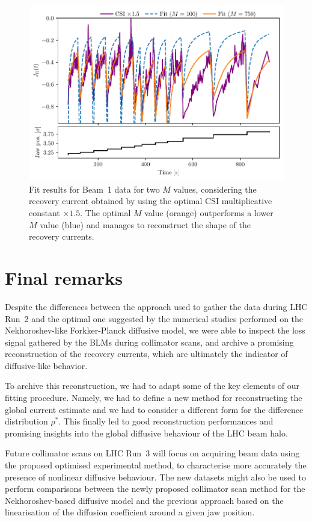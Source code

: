 \begin{figure}[hpt]
    \centering
    \includegraphics[trim={0 2.5mm 0 3mm}, clip, width=0.95\columnwidth]{5_Diffusion_measurement_LHC/figs/fifth.pdf}
    \caption{Fit results for Beam~1 data for two $M$ values, considering the recovery current obtained by using the optimal CSI multiplicative constant $\times 1.5$. The optimal $M$ value (orange) outperforms a lower $M$ value (blue) and manages to reconstruct the shape of the recovery currents.}
    \label{fig:fifth}
\end{figure}
%
\section{Final remarks}
%
Despite the differences between the approach used to gather the data during LHC Run~2 and the optimal one suggested by the numerical studies performed on the Nekhoroshev-like Forkker-Planck diffusive model, we were able to inspect the loss signal gathered by the BLMs during collimator scans, and archive a promising reconstruction of the recovery currents, which are ultimately the indicator of diffusive-like behavior.

To archive this reconstruction, we had to adapt some of the key elements of our fitting procedure. Namely, we had to define a new method for reconstructing the global current estimate and we had to consider a different form for the difference distribution $\rho^\ast$. This finally led to good reconstruction performances and promising insights into the global diffusive behaviour of the LHC beam halo.

Future collimator scans on LHC Run~3 will focus on acquiring beam data using the proposed optimised experimental method, to characterise more accurately the presence of nonlinear diffusive behaviour. The new datasets might also be used to perform comparisons between the newly proposed collimator scan method for the Nekhoroshev-based diffusive model and the previous approach based on the linearisation of the diffusion coefficient around a given jaw position.
